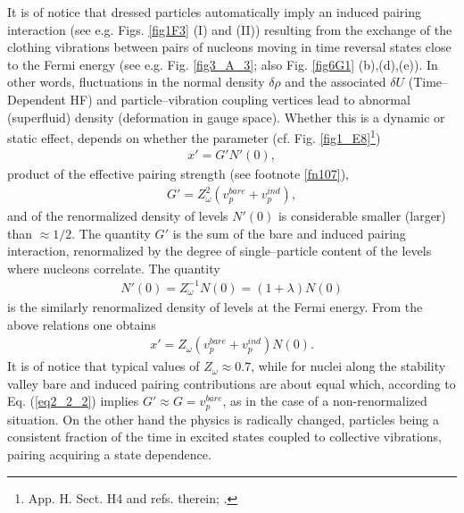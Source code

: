 It is of notice that dressed particles automatically imply an induced pairing interaction (see e.g. Figs. \ref{fig1F3} (I) and (II)) resulting from the exchange of the clothing vibrations between pairs of nucleons moving in time reversal states close to the Fermi energy (see e.g. Fig. \ref{fig3_A_3}; also Fig. \ref{fig6G1} (b),(d),(e)). In other words, fluctuations in the normal density $\delta \rho$ and the associated $\delta U$ (Time--Dependent HF) and particle--vibration coupling vertices lead to abnormal (superfluid) density (deformation in gauge space). Whether this is a dynamic or static effect, depends on whether the parameter (cf. Fig. \ref{fig1_E8}\footnote{\cite{Brink:05} App. H. Sect. H4 and refs. therein; \cite{Barranco:05}.}) 
\begin{align}\label{eq2_1_10}
x'=G'N'(0),  
\end{align}
product of the effective pairing strength (see footnote \ref{fn107}), 
\begin{align}\label{eq2_2_2}
G'=Z_\omega^2(v_p^{bare}+v_p^{ind}),
\end{align}
and of the renormalized density of levels $N'(0)$ is considerable smaller  (larger) than $\approx1/2$. The quantity $G'$ is the sum of the bare and induced pairing interaction, renormalized by the degree of single--particle content of the levels where nucleons correlate. The quantity 
\begin{align}
N'(0)=Z_\omega^{-1}N(0)=(1+\lambda)N(0)
\end{align}
is the similarly renormalized density of levels at the Fermi energy. From the above relations one obtains 
\begin{align}
x'=Z_\omega(v_p^{bare}+v_p^{ind})N(0).
\end{align}
It is of notice that typical values of $Z_\omega\approx0.7$, while for nuclei along the stability valley bare and induced pairing contributions are about equal which, according to Eq. (\ref{eq2_2_2}) implies $G'\approx G=v^{bare}_p$, as in the case of a non-renormalized situation. On the other hand the physics is radically changed, particles being a consistent fraction of the time in excited states coupled to collective vibrations, pairing acquiring a state dependence. 
 
